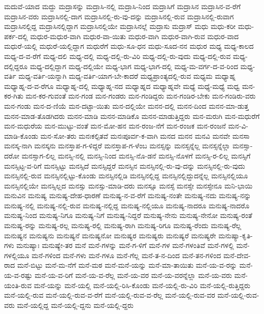 {ಮದುವೆ-ಯಾದ
ಮದ್ದು
ಮದ್ರಾಸನ್ನು
ಮದ್ರಾಸಿ-ನಲ್ಲಿ
ಮದ್ರಾಸಿ-ನಿಂದ
ಮದ್ರಾಸಿಗೆ
ಮದ್ರಾಸಿನ
ಮದ್ರಾಸಿನ-ವ-ರೆಗೆ
ಮದ್ರಾಸಿನ-ವರು
ಮದ್ರಾಸಿನಲ್ಲಿ-ದಾಗ
ಮದ್ರಾಸಿನಲ್ಲಿ-ರು-ವು-ದನ್ನು
ಮದ್ರಾಸಿನಲ್ಲಿ-ರುವ
ಮದ್ರಾಸಿನಲ್ಲಿ-ರುವಾಗ
ಮದ್ರಾಸಿನಲ್ಲಿದ್ದ
ಮದ್ರಾಸಿನಲ್ಲಿದ್ದಾಗ
ಮದ್ರಾಸಿನಲ್ಲಿಯೇ
ಮದ್ರಾಸಿನಲ್ಲೆ
ಮದ್ರಾಸು
ಮದ್ರಾಸ್
ಮಧು
ಮಧು-ಕರೀ
ಮಧು-ಪರ್ಕ-ದಲ್ಲಿ
ಮಧುರ-ಮಧುರ-ವಾಗಿ
ಮಧುರ-ವಾ-ಯಿತು
ಮಧುರ-ವಾಗಿ
ಮಧುರ-ವಾಗಿ-ರುವ
ಮಧುರ-ವಾದ
ಮಧುರೆ-ಯಲ್ಲಿ
ಮಧುರೆ-ಯಲ್ಲಿದ್ದಾಗ
ಮಧುರೆಗೆ
ಮಧು-ಸೂ-ಧನ
ಮಧು-ಸೂದ-ನನ
ಮಧುರ
ಮಧ್ಯ
ಮಧ್ಯ-ಕಾಲದ
ಮಧ್ಯ-ದ-ವ-ರೆಗೆ
ಮಧ್ಯ-ದಲಿ
ಮಧ್ಯ-ದಲ್ಲಿ
ಮಧ್ಯ-ದಲ್ಲಿ-ರು-ವಿರಿ
ಮಧ್ಯ-ದಲ್ಲಿ-ರು-ವುದು
ಮಧ್ಯ-ದಲ್ಲಿ-ರುವ
ಮಧ್ಯ-ದಲ್ಲಿದ್ದರೂ
ಮಧ್ಯ-ದಲ್ಲಿದ್ದಾಗ
ಮಧ್ಯ-ದಲ್ಲಿಯೇ
ಮಧ್ಯ-ಭಾಗ
ಮಧ್ಯ-ಭಾಗ-ದಲ್ಲಿ
ಮಧ್ಯ-ಮ-ವರ್ಗ-ದ-ವ-ರಿಂದ
ಮಧ್ಯ-ವರ್ತಿ
ಮಧ್ಯ-ವರ್ತಿ-ಯನ್ನಾಗಿ
ಮಧ್ಯ-ವರ್ತಿ-ಯಾಗ-ಬೇ-ಕಾದರೆ
ಮಧ್ಯಪ್ರಾಂತ್ಯದಲ್ಲಿ-ರುವ
ಮಧ್ಯಮ
ಮಧ್ಯಾಹ್ನ
ಮಧ್ಯಾಹ್ನ-ದ-ವ-ರೆಗೂ
ಮಧ್ಯಾಹ್ನ-ದಲ್ಲಿ
ಮಧ್ಯಾಹ್ನ-ನದ
ಮಧ್ಯಾಹ್ನದ
ಮಧ್ಯಾಹ್ನವೇ
ಮಧ್ಯೆ
ಮಧ್ಯೆ-ಮಧ್ಯೆ
ಮಧ್ವ
ಮನ-ಕರ-ಗಿತು
ಮನ-ಕರ-ಗುವಂತೆ
ಮನ-ಗಂಡ
ಮನ-ಗಂಡರು
ಮನ-ಗಂಡಿದ್ದರು
ಮನ-ಗಂಡಿರ-ಬೇಕು
ಮನ-ಗಂಡಿರು-ವರು
ಮನ-ಗಂಡು
ಮನ-ದ-ಣಿಯೆ
ಮನ-ದಟ್ಟಾ-ಯಿತು
ಮನ-ದಲ್ಲಿಯೇ
ಮನನ-ದಲ್ಲಿ
ಮನನ-ದಿಂದ
ಮನನ-ಮಾ-ಡುತ್ತ
ಮನನ-ಮಾಡ-ತೊಡಗಿದರು
ಮನನ-ಮಾಡಿ
ಮನನ-ಮಾಡಿಕೊ
ಮನನ-ಮಾಡುತ್ತಿದ್ದರು
ಮನ-ಮರುಗಿ
ಮನ-ಮಧುರೆಗೆ
ಮನ-ಮಧುರೆಯ
ಮನ-ಮುಟ್ಟು-ವಂತೆ
ಮನ-ಮೋ-ಹನ
ಮನ-ರಂಜ-ನೆಗೆ
ಮನ-ರಂಜಕ
ಮನ-ರಂಜನೆ
ಮನ-ವಿ-ಮಾಡಿ-ಕೊಂಡು
ಮನ-ಸೋ-ತರು
ಮನಃಕಲ್ಪಿತವೆ
ಮನಃಪೂರ್ವ-ಕ-ವಾಗಿ
ಮನದ
ಮನನ
ಮನವಿ
ಮನವೇ
ಮನಸಾ
ಮನಸ್ಕ-ನಾಗಿ
ಮನಸ್ಕನು
ಮನಸ್ತಾಪ-ಗ-ಳಿದ್ದರೆ
ಮನಸ್ತಾಪ-ಗ-ಳೆಂಬ
ಮನಸ್ಸನ್ನು
ಮನಸ್ಸನ್ನೆಲ್ಲ
ಮನಸ್ಸನ್ನೆಲ್ಲಾ
ಮನಸ್ಸಾ-ದರೋ
ಮನಸ್ಸಾಗ-ಲಿಲ್ಲ
ಮನಸ್ಸಿ-ನಲ್ಲಿ
ಮನಸ್ಸಿ-ನಿಂದ
ಮನಸ್ಸಿ-ನೊ-ಡನೆ
ಮನಸ್ಸಿ-ನೊಳಗೆ
ಮನಸ್ಸಿ-ರ-ಲಿಲ್ಲ
ಮನಸ್ಸಿಗೆ
ಮನಸ್ಸಿಟ್ಟ-ವ-ರಿಗೆ
ಮನಸ್ಸಿಟ್ಟು
ಮನಸ್ಸಿದೆ
ಮನಸ್ಸಿದ್ದರೆ
ಮನಸ್ಸಿನ
ಮನಸ್ಸಿನಲ್ಲಿ-ರು-ವು-ದನ್ನು
ಮನಸ್ಸಿನಲ್ಲಿ-ರು-ವುದು
ಮನಸ್ಸಿನಲ್ಲಿ-ರುವ
ಮನಸ್ಸಿನಲ್ಲಿಟ್ಟು-ಕೊಂಡು
ಮನಸ್ಸಿನಲ್ಲಿಡಿ
ಮನಸ್ಸಿನಲ್ಲಿದ್ದ
ಮನಸ್ಸಿನಲ್ಲಿದ್ದುದನ್ನೆಲ್ಲ
ಮನಸ್ಸಿನಲ್ಲಿಯೂ
ಮನಸ್ಸಿನಲ್ಲಿಯೇ
ಮನಸ್ಸಿಲ್ಲದ
ಮನಸ್ಸು
ಮನಸ್ಸು-ಮಾಡಿ-ದರು
ಮನಸ್ಸೂ
ಮನಸ್ಸೆ
ಮನಸ್ಸೇ
ಮನಸ್ಸೇನೂ
ಮನಿ-ಭಾಯಿ
ಮನುವಿನ
ಮನುಷ್ಯ
ಮನುಷ್ಯ-ದೇಹ-ಧಾರಣೆ
ಮನುಷ್ಯ-ನ-ವ-ರೆಗೆ
ಮನುಷ್ಯ-ನಂತೇ
ಮನುಷ್ಯ-ನದು
ಮನುಷ್ಯ-ನನ್ನು
ಮನುಷ್ಯ-ನಲ್ಲಿ
ಮನುಷ್ಯ-ನಲ್ಲಿ-ರುವ
ಮನುಷ್ಯ-ನಲ್ಲಿದ್ದ
ಮನುಷ್ಯ-ನಲ್ಲಿಯೂ
ಮನುಷ್ಯ-ನಾದರೂ
ಮನುಷ್ಯ-ನಾದರೊ
ಮನುಷ್ಯ-ನಿಂದ
ಮನುಷ್ಯ-ನಿಗೂ
ಮನುಷ್ಯ-ನಿಗೆ
ಮನುಷ್ಯ-ನಿದ್ದರೆ
ಮನುಷ್ಯ-ನೇನು
ಮನುಷ್ಯ-ನೇನೋ
ಮನುಷ್ಯ-ರಂತೆ
ಮನುಷ್ಯ-ರನ್ನು
ಮನುಷ್ಯ-ರಲ್ಲ
ಮನುಷ್ಯ-ರಲ್ಲಿ
ಮನುಷ್ಯ-ರಾಗಿ
ಮನುಷ್ಯ-ರಿಗೂ
ಮನುಷ್ಯ-ರೆಂದು
ಮನುಷ್ಯ-ರೆಲ್ಲ
ಮನುಷ್ಯನ
ಮನುಷ್ಯನು
ಮನುಷ್ಯನೆ
ಮನುಷ್ಯನೋ
ಮನುಷ್ಯರ
ಮನುಷ್ಯರು
ಮನುಷ್ಯರೆ
ಮನುಷ್ಯರೇ
ಮನುಷ್ಯಾ-ಕೃತಿ-ಗಳು
ಮನುಷ್ಯಾಃ
ಮನುಷ್ಯೇ-ತರ
ಮನೆ
ಮನೆ-ಗಳನ್ನು
ಮನೆ-ಗ-ಳಿಗೆ
ಮನೆ-ಗಳ
ಮನೆ-ಗಳಂತಿವೆ
ಮನೆ-ಗಳಲ್ಲಿ
ಮನೆ-ಗಳಲ್ಲಿಯೂ
ಮನೆ-ಗಳಿಂದ
ಮನೆ-ಗಳು
ಮನೆ-ಗಳೂ
ಮನೆ-ಗೆಲ್ಲ
ಮನೆ-ತ-ನ-ದಿಂದ
ಮನೆ-ತನ-ಗಳಿಂದ
ಮನೆ-ದೇವ-ರಾದ
ಮನೆ-ಬಿಟ್ಟು
ಮನೆ-ಮ-ನೆಗೆ
ಮನೆ-ಮಠ
ಮನೆ-ಮನೆ-ಯನ್ನು
ಮನೆ-ಮಾ-ತಾಯಿತು
ಮನೆ-ಯ-ವ-ರನ್ನು
ಮನೆ-ಯ-ವ-ರಷ್ಟು
ಮನೆ-ಯ-ವ-ರಿಗೆ
ಮನೆ-ಯ-ವ-ರೆಲ್ಲ
ಮನೆ-ಯ-ವರ
ಮನೆ-ಯ-ವರನ್ನೆಲ್ಲಾ
ಮನೆ-ಯ-ವರು
ಮನೆ-ಯಂತಿ-ರುವ
ಮನೆ-ಯನ್ನು
ಮನೆ-ಯಲ್ಲಿ
ಮನೆ-ಯಲ್ಲಿ-ರಿಸಿ-ಕೊಂಡು
ಮನೆ-ಯಲ್ಲಿ-ರು-ವಿರಿ
ಮನೆ-ಯಲ್ಲಿ-ರುತ್ತಿದ್ದರು
ಮನೆ-ಯಲ್ಲಿ-ರುವ
ಮನೆ-ಯಲ್ಲಿ-ರುವ-ವ-ರೆಗೆ
ಮನೆ-ಯಲ್ಲಿ-ರುವ-ವ-ರೆಲ್ಲ
ಮನೆ-ಯಲ್ಲಿ-ರುವ-ವರ
ಮನೆ-ಯಲ್ಲಿ-ರುವ-ವರು
ಮನೆ-ಯಲ್ಲಿದ್ದ
ಮನೆ-ಯಲ್ಲಿ-ದ್ದನು
ಮನೆ-ಯಲ್ಲಿ-ದ್ದರು
}

